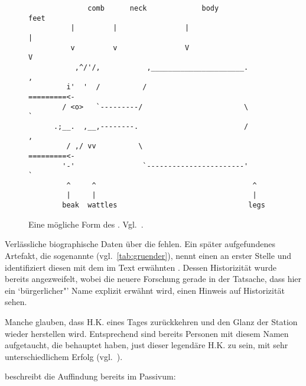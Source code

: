 \begin{figure}[ht!]
    \centering\small
    \begin{verbatim}
              comb      neck             body                    feet
          |         |                |                       |
          v         v                V                       V
           ,^/'/,           ,______________________.         ,
         i'  '  /          /                       =========<-
        / <o>   `---------/                        \         `
      .;__.  ,__,--------.                         /         ,
         / ,/ vv          \                        =========<-
        '-'                `-----------------------'         `
         ^     ^                                     ^
         |     |                                     |
        beak  wattles                               legs
    \end{verbatim}
    \caption{Eine mögliche Form des . Vgl.~\cite{rfc2321bressen}.}
    \label{fig:chicken}
\end{figure}

Verlässliche biographische Daten über die  fehlen. Ein später aufgefundenes Artefakt, die sogenannte  (vgl.~\cref{tab:gruender}), nennt einen  an erster Stelle und identifiziert diesen mit dem im Text erwähnten . Dessen Historizität wurde bereits angezweifelt, wobei die neuere Forschung gerade in der Tatsache, dass hier ein `bürgerlicher"' Name explizit erwähnt wird, einen Hinweis auf Historizität sehen. 

Manche glauben, dass H.K. eines Tages zurückkehren und den Glanz der Station wieder herstellen wird. Entsprechend sind bereits Personen mit diesem Namen aufgetaucht, die behauptet haben, just dieser legendäre H.K. zu sein, mit sehr unterschiedlichem Erfolg (vgl.~\cite{hardykrause}). 

 beschreibt die Auffindung bereits im Passivum: 


